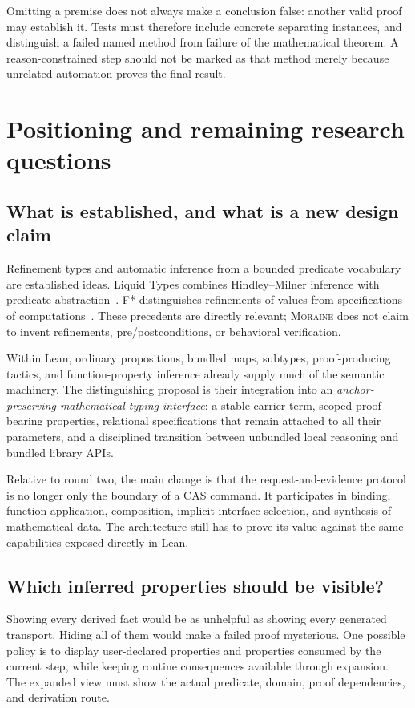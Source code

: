 \documentclass[11pt,letterpaper]{article}
\newcommand{\moraine}{\textsc{Moraine}}
\theoremstyle{definition}
\theoremstyle{remark}
\begin{document}
Omitting a premise does not always make a conclusion false: another valid proof
may establish it. Tests must therefore include concrete separating instances,
and distinguish a failed named method from failure of the mathematical theorem.
A reason-constrained step should not be marked as that method merely because
unrelated automation proves the final result.

\section{Positioning and remaining research questions}\label{sec:position}

\subsection{What is established, and what is a new design claim}
Refinement types and automatic inference from a bounded predicate vocabulary are
established ideas. Liquid Types combines Hindley--Milner inference with predicate
abstraction~\cite{Liquid}. F* distinguishes refinements of values from
specifications of computations~\cite{FStar}. These precedents are directly
relevant; \moraine{} does not claim to invent refinements, pre/postconditions, or
behavioral verification.

Within Lean, ordinary propositions, bundled maps, subtypes, proof-producing
tactics, and function-property inference already supply much of the semantic
machinery. The distinguishing proposal is their integration into an
\emph{anchor-preserving mathematical typing interface}: a stable carrier term,
scoped proof-bearing properties, relational specifications that remain attached
to all their parameters, and a disciplined transition between unbundled local
reasoning and bundled library APIs.

Relative to round two, the main change is that the request-and-evidence protocol
is no longer only the boundary of a CAS command. It participates in binding,
function application, composition, implicit interface selection, and synthesis
of mathematical data. The architecture still has to prove its value against the
same capabilities exposed directly in Lean.

\subsection{Which inferred properties should be visible?}
Showing every derived fact would be as unhelpful as showing every generated
transport. Hiding all of them would make a failed proof mysterious. One possible
policy is to display user-declared properties and properties consumed by the
current step, while keeping routine consequences available through expansion.
The expanded view must show the actual predicate, domain, proof dependencies,
and derivation route.
\end{document}
